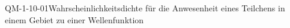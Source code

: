 
\begin{DEF}{QM-1-10-01}{Wahrscheinlichkeitsdichte für die Anwesenheit eines Teilchens in einem Gebiet zu einer Wellenfunktion}
\end{DEF}
